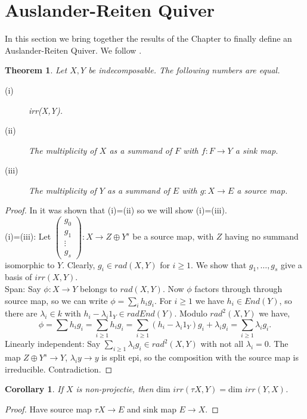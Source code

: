 \documentclass[11.5pt, twoside, a4paper, titlepage]{report}
\theoremstyle{definition}
\theoremstyle{plain}
\newtheorem{thm}[mydef]{Theorem}
\newtheorem{cor}[mydef]{Corollary}
\begin{document}
\section{Auslander-Reiten Quiver}

In this section we bring together the results of the Chapter to finally define an Auslander-Reiten Quiver. We follow \cite{CB3}.

\begin{thm}
Let $X,Y$ be indecomposable. The following numbers are equal.
\begin{description}
\item [(i)] irr(X,Y).
\item [(ii)] The multiplicity of $X$ as a summand of $F$ with $f:F\to Y$ a sink map.
\item [(iii)] The multiplicity of $Y$ as a summand of $E$ with $g:X \to E$ a source map.
\end{description}
\end{thm}
\begin{proof}
In \cite{CB3} it was shown that (i)=(ii) so we will show (i)=(iii).\\
(i)=(iii): Let $\left(\begin{smallmatrix}g_0 \\ g_1 \\ \vdots \\ g_s \end{smallmatrix}\right): X \to Z\oplus Y^s$ be a source map, with $Z$ having no summand isomorphic to $Y$. Clearly, $g_i \in rad(X,Y)$ for $i\geq 1$. We show that $g_1, \dots, g_s$ give a basis of $irr(X,Y)$. \\
Span: Say $\phi: X \to Y$ belongs to $rad(X,Y)$. Now $\phi$ factors through through source map, so we can write $\phi=\sum_i h_ig_i$. For $i\geq 1$ we have $h_i\in End(Y)$, so there are $\lambda_i \in k$ with $h_i-\lambda_i1_Y \in rad End(Y)$. Modulo $rad^2(X,Y)$ we have,
\begin{equation*}
\phi=\sum h_ig_i=\sum_{i\geq 1}h_ig_i=\sum_{i\geq 1}(h_i - \lambda_i1_Y)g_i + \lambda_ig_i=\sum_{i\geq 1}\lambda_ig_i.
\end{equation*}
Linearly independent: Say $\sum_{i\geq 1} \lambda_ig_i \in rad^2(X,Y)$ with not all $\lambda_i=0$. The map $Z \oplus Y^s \to Y$, $\lambda_iy \to y$ is split epi, so the composition with the source map is irreducible. Contradiction.
\end{proof}

\begin{cor}
If $X$ is non-projectie, then $\text{dim }irr(\tau X, Y)=\text{dim }irr(Y,X)$.
\end{cor}
\begin{proof}
Have source map $\tau X \to E$ and sink map $E \to X$.
\end{proof}
\end{document}
